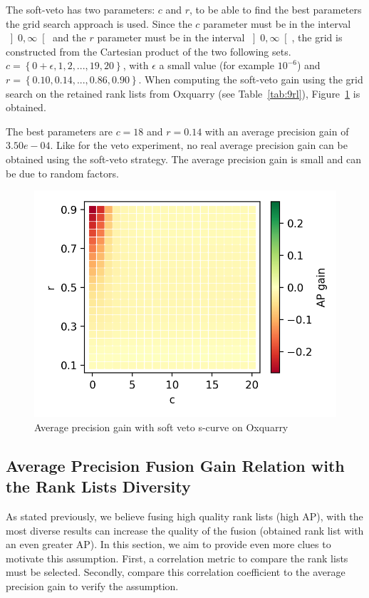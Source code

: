 The soft-veto has two parameters: $c$ and $r$, to be able to find the best parameters the grid search approach is used.
Since the $c$ parameter must be in the interval $\left]0, \infty\right[$ and the $r$ parameter must be in the interval $\left]0, \infty\right[$, the grid is constructed from the Cartesian product of the two following sets.
$c = \left\{0 + \epsilon, 1, 2, ..., 19, 20\right\}$, with $\epsilon$ a small value (for example $10^{-6}$) and $r = \left\{0.10, 0.14, ..., 0.86, 0.90\right\}$.
When computing the soft-veto gain using the grid search on the retained rank lists from Oxquarry (see Table~\ref{tab:9rl}), Figure~\ref{fig:soft_veto} is obtained.

The best parameters are $c=18$ and $r=0.14$ with an average precision gain of $3.50e-04$.
Like for the veto experiment, no real average precision gain can be obtained using the soft-veto strategy.
The average precision gain is small and can be due to random factors.

\begin{figure}
  \caption{Average precision gain with soft veto s-curve on Oxquarry}
  \label{fig:soft_veto}
  \includegraphics[width=\linewidth]{img/soft_veto.png}
\end{figure}

\subsection{Average Precision Fusion Gain Relation with the Rank Lists Diversity \label{sec:fusion_diversity}}

As stated previously, we believe fusing high quality rank lists (high AP), with the most diverse results can increase the quality of the fusion (obtained rank list with an even greater AP).
In this section, we aim to provide even more clues to motivate this assumption.
First, a correlation metric to compare the rank lists must be selected.
Secondly, compare this correlation coefficient to the average precision gain to verify the assumption.


